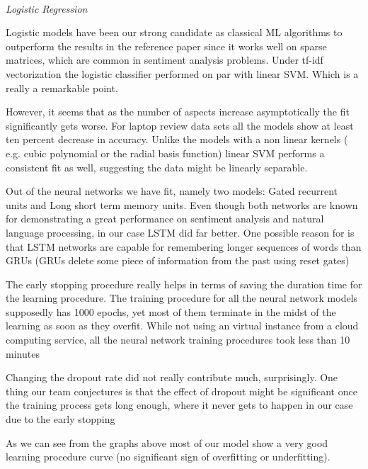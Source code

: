 \documentclass[comsoc,conference]{IEEEtran}
\begin{document}
\\ \emph{Logistic Regression}
\par Logistic models have been our strong candidate as classical ML algorithms to outperform the results in the reference paper since it works well on sparse matrices, which are common in sentiment analysis problems. Under tf-idf vectorization the logistic classifier performed on par with linear SVM.  Which is a really a remarkable point.
\par However, it seems that as the number of aspects increase asymptotically the fit significantly gets worse. For laptop review data sets all the models show at least ten percent decrease in accuracy.
Unlike the models with a non linear kernels ( e.g. cubic polynomial or the radial basis function) linear SVM performs a consistent fit as well, suggesting the data might be linearly separable.
\par Out of the neural networks we have fit, namely two models: Gated recurrent units and Long   short term memory units. Even though both networks are known for demonstrating a great performance on sentiment analysis and natural language processing, in our case LSTM did far better. One possible reason for is that LSTM networks are capable for remembering longer sequences of words than GRUs (GRUs delete some piece of information from the past using reset gates)
\par The early stopping procedure really helps in terms of saving the duration time for the learning procedure. The training procedure for all the neural network models supposedly has 1000 epochs, yet most of them terminate in the midst of the learning as soon as they overfit. While not using an virtual instance from a cloud computing service, all the neural network training procedures took less than 10 minutes
\par Changing the dropout rate did not really contribute much, surprisingly. One thing our team conjectures is that the effect of dropout might be significant once the training process gets long enough, where it never gets to happen in our case due to the early stopping
\par As we can see from the graphs above most of our model show a very good learning procedure curve (no significant sign of overfitting or underfitting).
\end{document}
